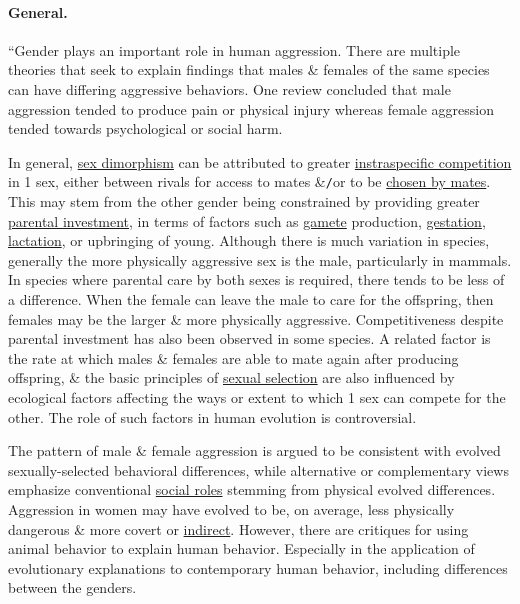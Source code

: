 \documentclass[oneside]{book}
\numberwithin{equation}{section}
\begin{document}
\paragraph{General.} ``Gender plays an important role in human aggression. There are multiple theories that seek to explain findings that males \& females of the same species can have differing aggressive behaviors. One review concluded that male aggression tended to produce pain or physical injury whereas female aggression tended towards psychological or social harm.

In general, \href{https://en.wikipedia.org/wiki/Sexual_dimorphism}{sex dimorphism} can be attributed to greater \href{https://en.wikipedia.org/wiki/Intraspecific_competition}{instraspecific competition} in 1 sex, either between rivals for access to mates \&\texttt{/}or to be \href{https://en.wikipedia.org/wiki/Mate_choice}{chosen by mates}. This may stem from the other gender being constrained by providing greater \href{https://en.wikipedia.org/wiki/Parental_investment}{parental investment}, in terms of factors such as \href{https://en.wikipedia.org/wiki/Gamete}{gamete} production, \href{https://en.wikipedia.org/wiki/Gestation}{gestation}, \href{https://en.wikipedia.org/wiki/Lactation}{lactation}, or upbringing of young. Although there is much variation in species, generally the more physically aggressive sex is the male, particularly in mammals. In species where parental care by both sexes is required, there tends to be less of a difference. When the female can leave the male to care for the offspring, then females may be the larger \& more physically aggressive. Competitiveness despite parental investment has also been observed in some species. A related factor is the rate at which males \& females are able to mate again after producing offspring, \& the basic principles of \href{https://en.wikipedia.org/wiki/Sexual_selection}{sexual selection} are also influenced by ecological factors affecting the ways or extent to which 1 sex can compete for the other. The role of such factors in human evolution is controversial.

The pattern of male \& female aggression is argued to be consistent with evolved sexually-selected behavioral differences, while alternative or complementary views emphasize conventional \href{https://en.wikipedia.org/wiki/Gender_role}{social roles} stemming from physical evolved differences. Aggression in women may have evolved to be, on average, less physically dangerous \& more covert or \href{https://en.wikipedia.org/wiki/Indirect_aggression}{indirect}. However, there are critiques for using animal behavior to explain human behavior. Especially in the application of evolutionary explanations to contemporary human behavior, including differences between the genders.
\end{document}
